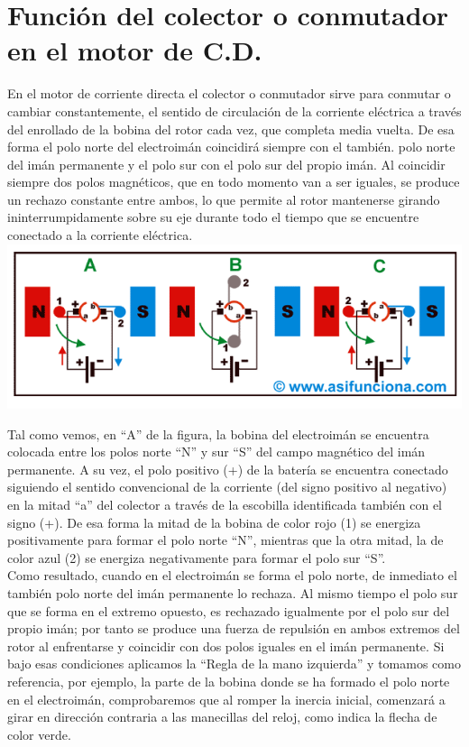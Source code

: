\documentclass[10pt,a4paper]{article}
\begin{document}
\section{Función del colector o conmutador en el motor de C.D.}
En el motor de corriente directa el colector o conmutador sirve para conmutar o cambiar constantemente, el sentido de circulación de la corriente eléctrica a través del enrollado de la bobina del rotor  cada  vez, que completa media vuelta. De esa forma el polo norte del electroimán coincidirá siempre con el también. polo norte del imán permanente y el polo sur con el polo sur del propio imán. Al coincidir siempre dos polos magnéticos, que en todo momento van a ser iguales, se produce un rechazo constante entre ambos, lo que permite al rotor mantenerse girando ininterrumpidamente sobre su eje durante todo el tiempo que se encuentre conectado a la corriente eléctrica.\\
\centering
\includegraphics[scale=.60]{motor.png}\\
\raggedright
Tal como vemos, en “A” de la figura, la bobina del electroimán se encuentra colocada entre los polos norte “N” y sur “S” del campo magnético del imán permanente. A su vez, el polo positivo (+) de la batería se encuentra conectado siguiendo el sentido convencional de la corriente (del signo positivo al negativo) en la mitad “a” del colector a través de la escobilla identificada también con el signo (+). De esa forma la mitad de la bobina de color rojo (1) se energiza positivamente para formar el polo norte “N”, mientras que la otra mitad, la de color azul (2) se energiza negativamente para formar el polo sur “S”.\\

Como resultado, cuando en el electroimán se forma el polo norte, de inmediato el también polo norte del imán permanente lo rechaza. Al mismo tiempo el polo sur que se forma en el extremo opuesto, es rechazado igualmente por el polo sur del propio imán; por tanto se produce una fuerza de repulsión en ambos extremos del rotor al enfrentarse y coincidir con dos polos iguales en el imán permanente. Si bajo esas condiciones aplicamos la “Regla de la mano izquierda” y tomamos como referencia, por ejemplo, la parte de la bobina donde se ha formado el polo norte en el electroimán, comprobaremos que al romper la inercia inicial, comenzará a girar en dirección contraria a las manecillas del reloj, como indica la flecha de color verde.\\
\end{document}
